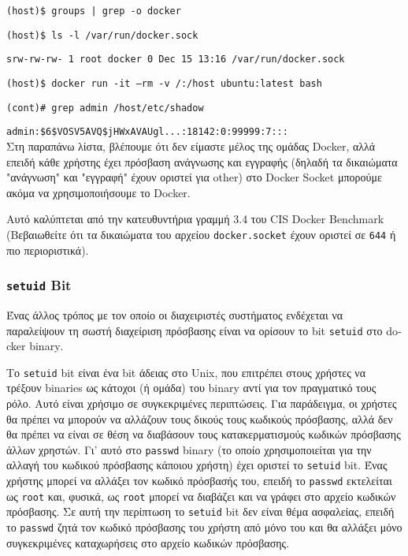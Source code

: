 \texttt{\textlatin{(host)\$ groups | grep -o docker}}

\texttt{\textlatin{(host)\$ ls -l /var/run/docker.sock}}

\texttt{\textlatin{srw-rw-rw- 1 root docker 0 Dec 15 13:16 /var/run/docker.sock}}

\texttt{\textlatin{(host)\$ docker run -it --rm -v /:/host ubuntu:latest bash}}

\texttt{\textlatin{(cont)\# grep admin /host/etc/shadow}}

\texttt{\textlatin{admin:\$6\$VOSV5AVQ\$jHWxAVAUgl...:18142:0:99999:7:::}} \\

Στη παραπάνω λίστα, βλέπουμε ότι δεν είμαστε μέλος της ομάδας
\textlatin{Docker}, αλλά επειδή κάθε χρήστης έχει πρόσβαση ανάγνωσης και
εγγραφής (δηλαδή τα δικαιώματα "ανάγνωση" και "εγγραφή" έχουν οριστεί για
\textlatin{other}) στο \textlatin{Docker Socket} μπορούμε ακόμα να
χρησιμοποιήσουμε το \textlatin{Docker}.

Αυτό καλύπτεται από την κατευθυντήρια γραμμή 3.4 του
\textlatin{CIS Docker Benchmark} (Βεβαιωθείτε ότι τα δικαιώματα του αρχείου
\texttt{\textlatin{docker.socket}} έχουν οριστεί σε \texttt{644} ή πιο
περιοριστικά).

\subsubsection{\texttt{\textlatin{setuid}} \textlatin{Bit}}

Ένας άλλος τρόπος με τον οποίο οι διαχειριστές συστήματος ενδέχεται να
παραλείψουν τη σωστή διαχείριση πρόσβασης είναι να ορίσουν το \textlatin{bit}
\texttt{\textlatin{setuid}} στο \textlatin{docker binary}.

Το \texttt{\textlatin{setuid}} \textlatin{bit} είναι ένα \textlatin{bit} άδειας
στο \textlatin{Unix}, που επιτρέπει στους χρήστες να τρέξουν
\textlatin{binaries} ως κάτοχοι (ή ομάδα) του \textlatin{binary} αντί για τον
πραγματικό τους ρόλο. Αυτό είναι χρήσιμο σε συγκεκριμένες περιπτώσεις. Για
παράδειγμα, οι χρήστες θα πρέπει να μπορούν να αλλάζουν τους δικούς τους
κωδικούς πρόσβασης, αλλά δεν θα πρέπει να είναι σε θέση να διαβάσουν τους
κατακερματισμούς κωδικών πρόσβασης άλλων χρηστών. Γι' αυτό στο
\texttt{\textlatin{passwd}} \textlatin{binary} (το οποίο χρησιμοποιείται για την
αλλαγή του κωδικού πρόσβασης κάποιου χρήστη) έχει οριστεί το
\texttt{\textlatin{setuid}} \textlatin{bit}. Ένας χρήστης μπορεί να αλλάξει τον
κωδικό πρόσβασής του, επειδή το \texttt{\textlatin{passwd}} εκτελείται ως
\texttt{\textlatin{root}} και,
φυσικά, ως \texttt{\textlatin{root}} μπορεί να διαβάζει και να γράφει στο αρχείο
κωδικών πρόσβασης. Σε αυτή την περίπτωση το \texttt{\textlatin{setuid}}
\textlatin{bit} δεν είναι θέμα ασφαλείας, επειδή το \texttt{\textlatin{passwd}}
ζητά τον κωδικό πρόσβασης του χρήστη από μόνο του και θα αλλάξει μόνο
συγκεκριμένες καταχωρήσεις στο αρχείο κωδικών πρόσβασης.

